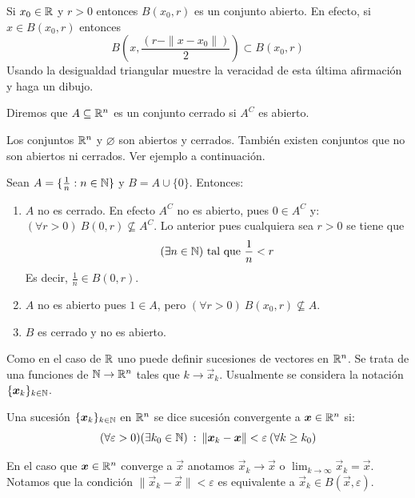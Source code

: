\begin{ejemplo}
Si $x_0\in\mathbb{R}$ y $r>0$ entonces $B(x_0,r)$ es un conjunto abierto. En efecto,
si $x\in B(x_0,r)$ entonces $$B\left(x, \frac{(r-\|x-x_0\|)}{2}\right)\subset B(x_0,r)$$ 
Usando la desigualdad triangular 
muestre la veracidad de esta \'ultima afirmaci\'on y haga un dibujo.
\end{ejemplo}

\begin{definicion} 
Diremos que $A\subseteq \mathbb{R}^n$ es un conjunto cerrado si $A^C$ es abierto.
\end{definicion}  

\begin{nota}
Los conjuntos $\mathbb{R}^n$ y $\varnothing$ son abiertos y cerrados.
Tambi\'en existen conjuntos que no son abiertos ni cerrados. Ver ejemplo a continuaci\'on.
\end{nota}

\begin{ejemplo} Sean $A=\{\frac{1}{n} :n\in \mathbb{N}\}$ y $B=A\cup\{0\}$. Entonces:
\begin{enumerate}
\item $A$ no es cerrado. En efecto $A^C$ no es abierto, pues $0\in A^C$ y:
$(\forall r>0) \: B(0,r)\not\subseteq A^C.$ Lo anterior pues cualquiera 
sea $r>0$ se tiene que 
$$ 
(\exists n\in \mathbb{N}) \text{ tal que } \frac{1}{n}<r
$$ 
Es decir, $\frac{1}{n} \in B(0,r)$.
\item $A$ no es abierto pues  $1\in A$, pero $(\forall r>0)\: B(x_0,r)\not\subseteq A$.
\item $B$ es cerrado y no es abierto.
\end{enumerate}
\end{ejemplo}

Como en el caso de $\mathbb{R}$ uno puede definir sucesiones de vectores en $\mathbb{R}^n$.
Se trata de una funciones de    $\mathbb{N} \to \mathbb{R}^n$ tales que $k\to \vec{x}_k$. Usualmente
se considera la notaci\'on $\{\boldsymbol{x}_k\}_{k\in\mathbb{N}}$. 

\begin{definicion} Una sucesi\'on $\{\boldsymbol{x}_k\}_{k\in\mathbb{N}}$ en $\mathbb{R}^n$ se dice sucesi\'on convergente  a $\boldsymbol{x}\in \mathbb{R}^n$ si:
$$(\forall \varepsilon >0)(\exists k_0\in \mathbb{N})
\::\: \|\boldsymbol{x}_k-\boldsymbol{x}\|<\varepsilon \: (\forall k\geq k_0)$$
\end{definicion}
En el caso que $\boldsymbol{x}\in \mathbb{R}^n$ converge a $\vec{x}$ anotamos $\vec{x}_k\to \vec{x}$ o $\lim_{k\to\infty}\vec{x}_k=\vec{x}$. 
Notamos que la condici\'on $ \|\vec{x}_k-\vec{x}\|<\varepsilon$ es 
equivalente a $\vec{x}_k\in B(\vec{x},\varepsilon).$


